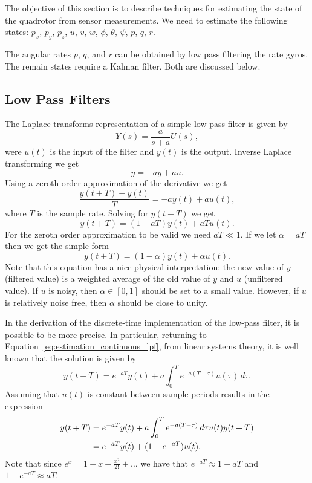{The objective of this section is to describe techniques for
estimating the state of the quadrotor from sensor measurements.  We
need to estimate the following states:  $p_x$, $p_y$, $p_z$, $u$,
$v$, $w$, $\phi$, $\theta$, $\psi$, $p$, $q$, $r$.

The angular rates $p$, $q$, and $r$ can be obtained by low pass
filtering the rate gyros.  The remain states require a Kalman
filter.  Both are discussed below.

\subsection{Low Pass Filters}

The Laplace transforms representation of a simple low-pass filter is
given by
\[
Y(s) = \frac{a}{s+a} U(s),
\]
were $u(t)$ is the input of the filter and $y(t)$ is the output.
Inverse Laplace transforming we get
\begin{equation} \label{eq:estimation_continuous_lpf}
\dot{y} = -ay + au.
\end{equation}
Using a zeroth order approximation of the derivative we get
\[
\frac{y(t+T)-y(t)}{T} = -ay(t) + au(t),
\]
where $T$ is the sample rate.  Solving for $y(t+T)$ we get
\[
y(t+T) = (1-aT)y(t) + aTu(t).
\]
For the zeroth order approximation to be valid we need $aT\ll 1$. If
we let $\alpha = aT$ then we get the simple form
\[
y(t+T) = (1-\alpha)y(t) + \alpha u(t).
\]
Note that this equation has a nice physical interpretation: the new
value of $y$ (filtered value) is a weighted average of the old value
of $y$ and $u$ (unfiltered value).  If $u$ is noisy, then
$\alpha\in[0,1]$ should be set to a small value.  However, if $u$ is
relatively noise free, then $\alpha$ should be close to unity.

In the derivation of the discrete-time implementation of the
low-pass filter, it is possible to be more precise. In particular,
returning to Equation~\eqref{eq:estimation_continuous_lpf}, from
linear systems theory, it is well known that the solution is given
by
\[
y(t+T) = e^{-aT} y(t) + a\int_0^T e^{-a(T-\tau)}u(\tau)\,d\tau.
\]
Assuming that $u(t)$ is constant between sample periods results in
the expression
\begin{align}
y(t+T) &= e^{-aT} y(t) + a\int_0^T e^{-a(T-\tau)}\,d\tau u(t) y(t+T)
        \notag \\
       &= e^{-aT} y(t) + (1-e^{-aT}) u(t).
        \label{eq:estimation_lpf}
\end{align}
Note that since $e^x = 1 + x + \frac{x^2}{2!} + \dots$ we have that
$e^{-aT}\approx 1-aT$ and $1-e^{-aT}\approx aT$.

}
